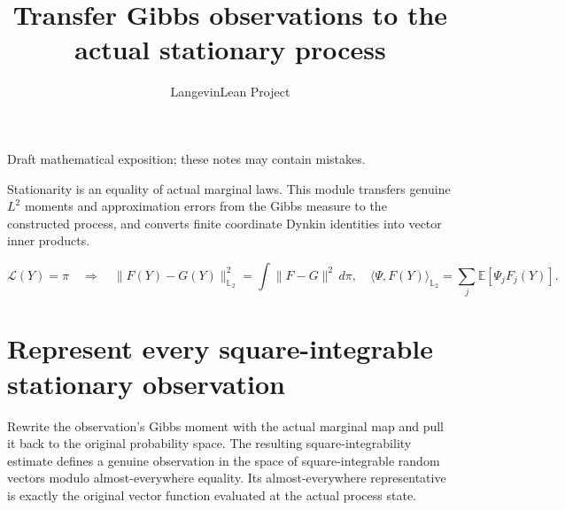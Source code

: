\documentclass[11pt,a4paper]{article}
\title{\texorpdfstring{Transfer Gibbs observations to the actual stationary process}{Transfer Gibbs observations to the actual stationary process}}
\author{LangevinLean Project}
\date{}
\begin{document}
\maketitle
Draft mathematical exposition; these notes may contain mistakes.


Stationarity is an equality of actual marginal laws. This module transfers genuine \(L^{2}\) moments and approximation errors from the Gibbs measure to the constructed process, and converts finite coordinate Dynkin identities into vector inner products.

\[\mathcal L(Y)=\pi\quad\Longrightarrow\quad\|F(Y)-G(Y)\|_{\mathbb L_2}^2=\int\|F-G\|^2\,d\pi,\quad \langle\Psi,F(Y)\rangle_{\mathbb L_2}=\sum_j\mathbb E[\Psi_jF_j(Y)].\]
\section{\texorpdfstring{Represent every square-integrable stationary observation}{Represent every square-integrable stationary observation}}


Rewrite the observation's Gibbs moment with the actual marginal map and pull it back to the original probability space. The resulting square-integrability estimate defines a genuine observation in the space of square-integrable random vectors modulo almost-everywhere equality. Its almost-everywhere representative is exactly the original vector function evaluated at the actual process state.
\end{document}
